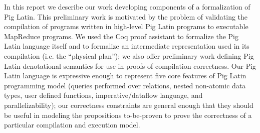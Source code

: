 In this report we describe our work developing components of a formalization of Pig Latin. This preliminary work is motivated by the problem of validating the compilation of programs written in high-level Pig Latin programs to executable MapReduce programs. We used the Coq proof assistant to formalize the Pig Latin language itself and to formalize an intermediate representation used in its compilation (i.e. the ``physical plan''); we also offer preliminary work defining Pig Latin denotational semantics for use in proofs of compilation correctness. Our Pig Latin language is expressive enough to represent five core features of Pig Latin programming model (queries performed over relations, nested non-atomic data types, user defined functions, imperative/dataflow language, and parallelizability); our correctness constraints are general enough that they should be useful in modeling the propositions to-be-proven to prove the correctness of a particular compilation and execution model.
